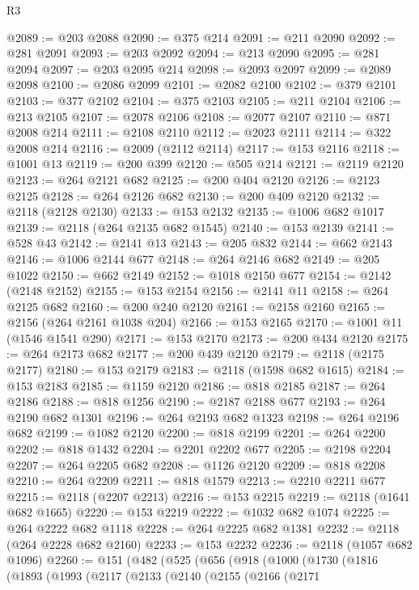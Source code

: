 \begin{lexlean}{R3}
\begin{coremodule}
@2089 := @203 @2088
@2090 := @375 @214
@2091 := @211 @2090
@2092 := @281 @2091
@2093 := @203 @2092
@2094 := @213 @2090
@2095 := @281 @2094
@2097 := @203 @2095 @214
@2098 := @2093 @2097
@2099 := @2089 @2098
@2100 := @2086 @2099
@2101 := @2082 @2100
@2102 := @379 @2101
@2103 := @377 @2102
@2104 := @375 @2103
@2105 := @211 @2104
@2106 := @213 @2105
@2107 := @2078 @2106
@2108 := @2077 @2107
@2110 := @871 @2008 @214
@2111 := @2108 @2110
@2112 := @2023 @2111
@2114 := @322 @2008 @214
@2116 := @2009 (@2112 @2114)
@2117 := @153 @2116
@2118 := @1001 @13
@2119 := @200 @399
@2120 := @505 @214
@2121 := @2119 @2120
@2123 := @264 @2121 @682
@2125 := @200 @404 @2120
@2126 := @2123 @2125
@2128 := @264 @2126 @682
@2130 := @200 @409 @2120
@2132 := @2118 (@2128 @2130)
@2133 := @153 @2132
@2135 := @1006 @682 @1017
@2139 := @2118 (@264 @2135 @682 @1545)
@2140 := @153 @2139
@2141 := @528 @43
@2142 := @2141 @13
@2143 := @205 @832
@2144 := @662 @2143
@2146 := @1006 @2144 @677
@2148 := @264 @2146 @682
@2149 := @205 @1022
@2150 := @662 @2149
@2152 := @1018 @2150 @677
@2154 := @2142 (@2148 @2152)
@2155 := @153 @2154
@2156 := @2141 @11
@2158 := @264 @2125 @682
@2160 := @200 @240 @2120
@2161 := @2158 @2160
@2165 := @2156 (@264 @2161 @1038 @204)
@2166 := @153 @2165
@2170 := @1001 @11 (@1546 @1541 @290)
@2171 := @153 @2170
@2173 := @200 @434 @2120
@2175 := @264 @2173 @682
@2177 := @200 @439 @2120
@2179 := @2118 (@2175 @2177)
@2180 := @153 @2179
@2183 := @2118 (@1598 @682 @1615)
@2184 := @153 @2183
@2185 := @1159 @2120
@2186 := @818 @2185
@2187 := @264 @2186
@2188 := @818 @1256
@2190 := @2187 @2188 @677
@2193 := @264 @2190 @682 @1301
@2196 := @264 @2193 @682 @1323
@2198 := @264 @2196 @682
@2199 := @1082 @2120
@2200 := @818 @2199
@2201 := @264 @2200
@2202 := @818 @1432
@2204 := @2201 @2202 @677
@2205 := @2198 @2204
@2207 := @264 @2205 @682
@2208 := @1126 @2120
@2209 := @818 @2208
@2210 := @264 @2209
@2211 := @818 @1579
@2213 := @2210 @2211 @677
@2215 := @2118 (@2207 @2213)
@2216 := @153 @2215
@2219 := @2118 (@1641 @682 @1665)
@2220 := @153 @2219
@2222 := @1032 @682 @1074
@2225 := @264 @2222 @682 @1118
@2228 := @264 @2225 @682 @1381
@2232 := @2118 (@264 @2228 @682 @2160)
@2233 := @153 @2232
@2236 := @2118 (@1057 @682 @1096)
@2260 := @151
    (@482
      (@525
        (@656
          (@918
            (@1000
              (@1730
                (@1816
                  (@1893
                    (@1993
                      (@2117
                        (@2133
                          (@2140
                            (@2155
                              (@2166
                                (@2171

\end{coremodule}
\end{lexlean}
